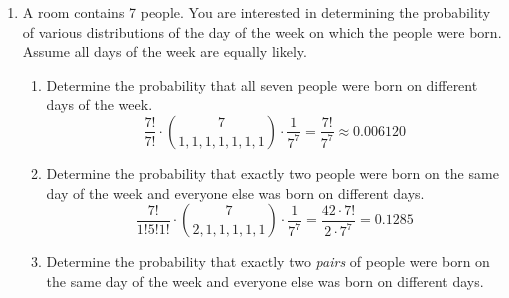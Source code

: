 \documentclass{article}
\begin{document}
\begin{enumerate}
\begin{enumerate}
        \\
        \[\text{number $\pm$ error} = \boxed{3.2675 \pm 0.004787}\]
        \item Use the normal distribution to estimate the probability that a fifth measurement of this length results in any value $\le 3.25$ cm.
        \\
        \[z = \frac{3.25-3.2675}{0.009574} \approx -1.8278, P(X \le 3.25) \approx \boxed{0.03379}\]
        \item Suppose a 5th measurement was taken before the results were analyzed and the result was 3.25 cm. Re-do parts (a)-(c) with this new data and comment on any differences seen in the new part (c). How is this situation similar to that found in part (f) on problem 1?
        \\ 
        \[\langle k \rangle = \frac{3.26 + 3.28 + 3.26 + 3.27 + 3.25}{5} = \boxed{3.264}, \sigma_k = \sqrt{\frac{1}{4}\sum_{i=1}^5 (x_i - \langle k \rangle)^2} \approx \boxed{0.01140}\]
        \[\text{number $\pm$ error} = \boxed{3.264 \pm 0.005701}\]
        \[z = \frac{3.25-3.264}{0.01140} \approx -1.2279, P(X \le 3.25) \approx \boxed{0.1097}\]
        This is similar to the situation in part (f) of problem 1 because the additional information of the 5th measurement being 3.25 cm increases the standard deviation and lowers the mean, which makes it more likely that a random measurement will result in 3.25 cm or less.
        \end{enumerate}
    \item A room contains 7 people. You are interested in determining the probability of various distributions of the day of the week on which the people were born. Assume all days of the week are equally likely.
    \begin{enumerate}
        \item Determine the probability that all seven people were born on different days of the week.
        \\ 
        \[  \frac{7!}{7!} \cdot \binom{7}{1,1,1,1,1,1,1} \cdot \frac 1 {7^7} = \frac{7!}{7^7} \approx \boxed{0.006120}\]
        \item Determine the probability that exactly two people were born on the same day of the week and everyone else was born on different days.
        \\
        \[\frac{7!}{1!5!1!} \cdot \binom{7}{2,1,1,1,1,1} \cdot \frac{1}{7^7} = \frac{42 \cdot 7!}{2 \cdot 7^7} = \boxed{0.1285}\]
        \item Determine the probability that exactly two \textit{pairs} of people were born on the same day of the week and everyone else was born on different days.

\end{enumerate}
\end{enumerate}
\end{document}
